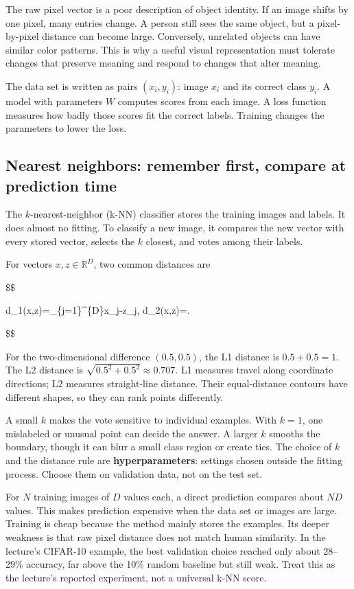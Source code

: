 The raw pixel vector is a poor description of object identity. If an image shifts by one pixel, many entries change. A person still sees the same object, but a pixel-by-pixel distance can become large. Conversely, unrelated objects can have similar color patterns. This is why a useful visual representation must tolerate changes that preserve meaning and respond to changes that alter meaning.

The data set is written as pairs \((x_i,y_i)\): image \(x_i\) and its correct class \(y_i\). A model with parameters \(W\) computes scores from each image. A loss function measures how badly those scores fit the correct labels. Training changes the parameters to lower the loss.

\subsection{Nearest neighbors: remember first, compare at prediction time}\label{04-visual-computing-ii-ch031-nearest-neighbors-remember-first-compare-at-prediction-time}

The \(k\)-nearest-neighbor (k-NN) classifier stores the training images and labels. It does almost no fitting. To classify a new image, it compares the new vector with every stored vector, selects the \(k\) closest, and votes among their labels.

For vectors \(x,z\in\mathbb{R}^D\), two common distances are

\$\$

d\_1(x,z)=\sum\_\{j=1\}\^{}\{D\}\textbar x\_j-z\_j\textbar, \qquad d\_2(x,z)=.

\$\$

For the two-dimensional difference \((0.5,0.5)\), the L1 distance is \(0.5+0.5=1\). The L2 distance is \(\sqrt{0.5^2+0.5^2}\approx0.707\). L1 measures travel along coordinate directions; L2 measures straight-line distance. Their equal-distance contours have different shapes, so they can rank points differently.

A small \(k\) makes the vote sensitive to individual examples. With \(k=1\), one mislabeled or unusual point can decide the answer. A larger \(k\) smooths the boundary, though it can blur a small class region or create ties. The choice of \(k\) and the distance rule are \textbf{hyperparameters}: settings chosen outside the fitting process. Choose them on validation data, not on the test set.

For \(N\) training images of \(D\) values each, a direct prediction compares about \(ND\) values. This makes prediction expensive when the data set or images are large. Training is cheap because the method mainly stores the examples. Its deeper weakness is that raw pixel distance does not match human similarity. In the lecture's CIFAR-10 example, the best validation choice reached only about 28--29\% accuracy, far above the 10\% random baseline but still weak. Treat this as the lecture's reported experiment, not a universal k-NN score.

